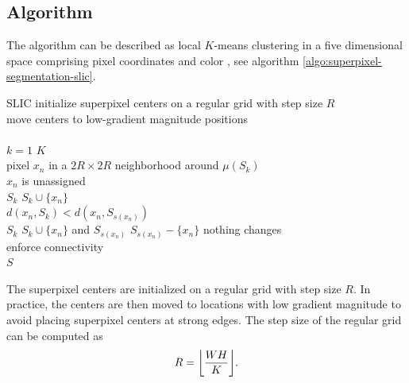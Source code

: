 \subsection{Algorithm}

The algorithm can be described as local $K$-means clustering in a five dimensional space comprising pixel coordinates and color \cite{AchantaShajiSmithLucchiFuaSuesstrunk:2010}, see algorithm \ref{algo:superpixel-segmentation-slic}.
\begin{algorithm}[t!]
	\begin{algo}{SLIC}{\label{algo:superpixel-segmentation-slic}}
		initialize superpixel centers on a regular grid with step size $R$\\
		move centers to low-gradient magnitude positions\\
		\qrepeat\\
			\qfor $k = 1$ \qto $K$\\
				\qforeach pixel $x_n$ in a $2R \times 2R$ neighborhood around $\mu(S_k)$\\
					\qif $x_n$ is unassigned\\
						\qthen $S_k$ \qlet $S_k \cup \{x_n\}$\qfi\\
					\qelseif $d(x_n, S_k) < d(x_n, S_{s(x_n)})$\\
						\qthen $S_k$ \qlet $S_k \cup \{x_n\}$ and $S_{s(x_n)}$ \qlet $S_{s(x_n)} - \{x_n\}$\qfi\qrof\qrof
		\quntil nothing changes \\
		enforce connectivity\\
		\qreturn $S$
	\end{algo}
	\caption[The basic algorithm of \textbf{SLIC} \cite{AchantaShajiSmithLucchiFuaSuesstrunk:2010}.]{\textbf{SLIC} is implemented as local $K$-means clustering. Here, local means that for each superpixel only pixels in a $2R \times 2R$ window around the superpixel's center are of interest. After clustering, \textbf{SLIC} needs to enforce connectivity.}
	\label{fig:superpixel-segmentation-slic-algorithm}
\end{algorithm}
The superpixel centers are initialized on a regular grid with step size $R$. In practice, the centers are then moved to locations with low gradient magnitude to avoid placing superpixel centers at strong edges. The step size of the regular grid can be computed as
\begin{align}
	R = \floor*{\frac{WH}{K}}.
\end{align}

